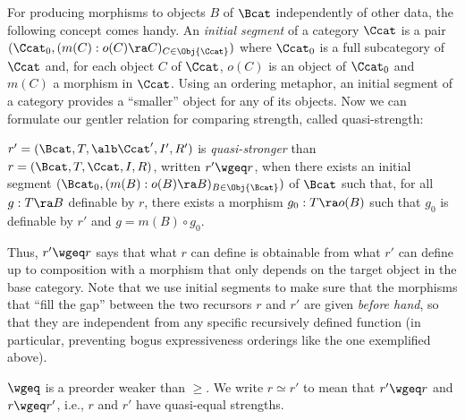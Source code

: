 For %
producing morphisms to objects $B$ of $\Bcat$ independently of other data, %
the following concept comes handy.  
An \emph{initial segment} of a category $\Ccat$ is a pair $(\Ccat_0,(m(C):o(C)\ra C)_{C \in \Obj{\Ccat}})$ where $\Ccat_0$ is a full subcategory 
of $\Ccat$ and, for each object $C$ of $\Ccat$, $o(C)$ is an object of $\Ccat_0$
 and $m(C)$ a morphism in $\Ccat$. 
Using an ordering metaphor, %
an initial segment of a category provides a ``smaller'' object for any of its objects.   
%
Now we can formulate our gentler relation for comparing strength, 
called quasi-strength:  

\begin{defi} \rm \label{defi-qstrong} 
$r'= (\Bcat,T,\alb \Ccat',I',R')$ is %
\emph{quasi-stronger} than $r = (\Bcat,T,\Ccat,I,R)$, written $r' \wgeq r$,
when there exists an initial segment $(\Bcat_0,(m(B):o(B)\ra B)_{B \in \Obj{\Bcat}})$ of $\Bcat$ such that, 
for all 
$g: T \ra B$ definable by $r$, there exists 
a morphism $g_0: T \ra o(B)$ such that $g_0$ is definable by $r'$ and $g = m(B) \circ g_0$.  
\end{defi} 

Thus, $r' \wgeq r$ says that what $r$ can define is obtainable from what $r'$ can define up to composition with a morphism that only depends on the target object %
 in the base category.  
 Note that we use initial segments to make sure that the morphisms that ``fill the gap'' between the two recursors $r$ and $r'$ are given \emph{before hand}, so that they are independent from any specific recursively defined function (in particular, preventing bogus expressiveness orderings like the one exemplified above). 
 
$\wgeq$ is a preorder %
weaker than $\geq$. We write $r \simeq r'$ to mean %
that %
$r' \wgeq r$ and $r \wgeq r'$, %
i.e., $r$ and $r'$ have quasi-equal strengths. 

